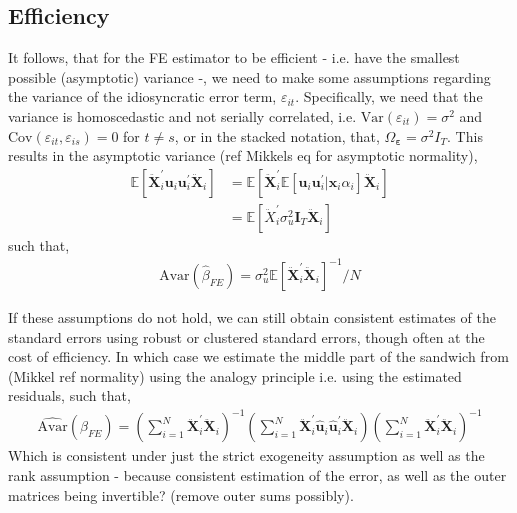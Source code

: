 \subsection{Efficiency}

It follows, that for the FE estimator to be efficient - i.e. have the smallest possible (asymptotic) variance -, we need to make some assumptions regarding the variance of the idiosyncratic error term, $\varepsilon_{it}$. Specifically, we need that the variance is homoscedastic and not serially correlated, i.e. $\text{Var}(\varepsilon_{it}) = \sigma^2$ and $\text{Cov}(\varepsilon_{it}, \varepsilon_{is}) = 0$ for $t \neq s$, or in the stacked notation, that, $\Omega_{\bm{\varepsilon}} = \sigma^2 I_T$. This results in the asymptotic variance (ref Mikkels eq for asymptotic normality), 
\begin{align*}
    \mathbb{E}\left[ \bm{\ddot{X}}_i^\prime \bm{u}_i \bm{u}_i^\prime \bm{\ddot{X}}_i \right] &= \mathbb{E}\left[ \bm{\ddot{X}}_i^\prime \mathbb{E}[\bm{u}_i \bm{u}_i^\prime | \bm{x}_i \alpha_i]\bm{\ddot{X}}_i \right] \\
    &= \mathbb{E}[\ddot{X}_i^\prime \sigma_u^2 \bm{I}_T \bm{\ddot{X}}_i]
\end{align*}
such that, 
\begin{align*}
    \text{Avar}(\hat{\beta}_{FE}) = \sigma_u^2 \mathbb{E}[\bm{\ddot{X}}_i^\prime \bm{\ddot{X}}_i]^{-1} / N
\end{align*}

If these assumptions do not hold, we can still obtain consistent estimates of the standard errors using robust or clustered standard errors, though often at the cost of efficiency. In which case we estimate the middle part of the sandwich from (Mikkel ref normality) using the analogy principle i.e. using the estimated residuals, such that, 
\begin{align*}
    \hat{\text{Avar}}(\hat{\beta}_{FE}) = \left( \sum_{i=1}^N \bm{\ddot{X}}_i^\prime \bm{\ddot{X}}_i \right)^{-1} \left( \sum_{i=1}^N \bm{\ddot{X}}_i^\prime \hat{\bm{u}}_i \hat{\bm{u}}_i^\prime \bm{\ddot{X}}_i \right) \left( \sum_{i=1}^N \bm{\ddot{X}}_i^\prime \bm{\ddot{X}}_i \right)^{-1}
\end{align*} 
Which is consistent under just the strict exogeneity assumption as well as the rank assumption - because consistent estimation of the error, as well as the outer matrices being invertible? (remove outer sums possibly). 